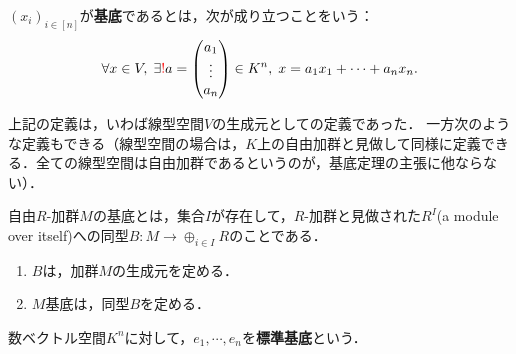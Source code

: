 \documentclass[uplatex, 12pt, dvipdfmx]{jsreport}
\begin{document}
\begin{definition}[basis]
    $(x_i)_{i\in [n]}$が\textbf{基底}であるとは，次が成り立つことをいう：
    \[ \forall x\in V,\; \exists\textcolor{red}{!} a=\begin{pmatrix}a_1\\\vdots\\a_n\end{pmatrix}\in K^n,\; x=a_1x_1+\cdots+a_nx_n. \]
\end{definition}
\begin{remark}[圏論的な基底の定義]
    上記の定義は，いわば線型空間$V$の生成元としての定義であった．
    一方次のような定義もできる（線型空間の場合は，$K$上の自由加群と見做して同様に定義できる．全ての線型空間は自由加群であるというのが，基底定理の主張に他ならない）．

    自由$R$-加群$M$の基底とは，集合$I$が存在して，$R$-加群と見做された$R^I$(a module over itself)への同型$B:M\to\oplus_{i\in I}R$のことである．
\end{remark}
\begin{proposition}[基底の特徴付け１]\mbox{}
    \begin{enumerate}
        \item $B$は，加群$M$の生成元を定める．
        \item $M$基底は，同型$B$を定める．
    \end{enumerate}
\end{proposition}

\begin{definition}
    数ベクトル空間$K^n$に対して，$e_1,\cdots,e_n$を\textbf{標準基底}という．
\end{definition}
\end{document}
